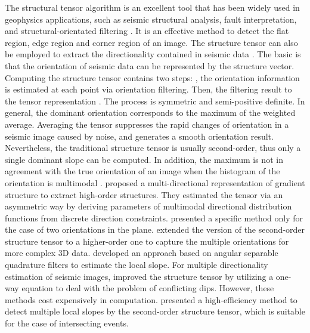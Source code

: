 The structural tensor algorithm is an excellent tool that has been widely used in geophysics applications, such as seismic structural analysis, fault interpretation, and structural-orientated filtering .
It is an effective method to detect the flat region, edge region and corner region of an image.  
The structure tensor can also be employed to extract the directionality contained in seismic data \cite[]{1995Estimators, 1997A, Fehmers2003Fast}.   
The basic is that the orientation of seismic data can be represented by the structure vector. Computing the structure tensor contains two steps:  , the orientation information is estimated at each point via orientation filtering. Then,  the filtering result to the tensor representation \cite{1986Analyzing, 1991Computing, webmaster1992Adaptive}. The process is symmetric and semi-positive definite. In general, the dominant orientation corresponds to the maximum of the weighted average. Averaging the tensor suppresses the rapid changes of orientation in a seismic image caused by noise, and generates a smooth orientation result.
Nevertheless, the traditional structure tensor is usually second-order, thus only a single dominant slope can be computed. In addition, the maximum is not in agreement with the true orientation of an image when the  histogram of the orientation is multimodal \cite{image2002}.
\cite{2006An} proposed a multi-directional representation of gradient structure to extract high-order structures. They estimated the tensor via an asymmetric way by deriving parameters of multimodal directional distribution functions from discrete direction constraints. \cite{2007Representing} presented a specific method only for the case of two orientations  in the plane. 
\cite{2009A} extended the version of the second-order structure tensor to a higher-order one to capture the multiple orientations for more complex 3D data. 
\cite{2009Representing} developed an approach based on angular separable quadrature filters to estimate the local slope.  For multiple directionality estimation of seismic images, \cite{2013Extended} improved the structure
tensor by utilizing a one-way equation to deal with the problem of conflicting dips. 
However, these methods cost expensively in computation.
\cite{2015Compression} presented a high-efficiency method to detect multiple local slopes by the second-order structure tensor, which is suitable for the case of intersecting events.

